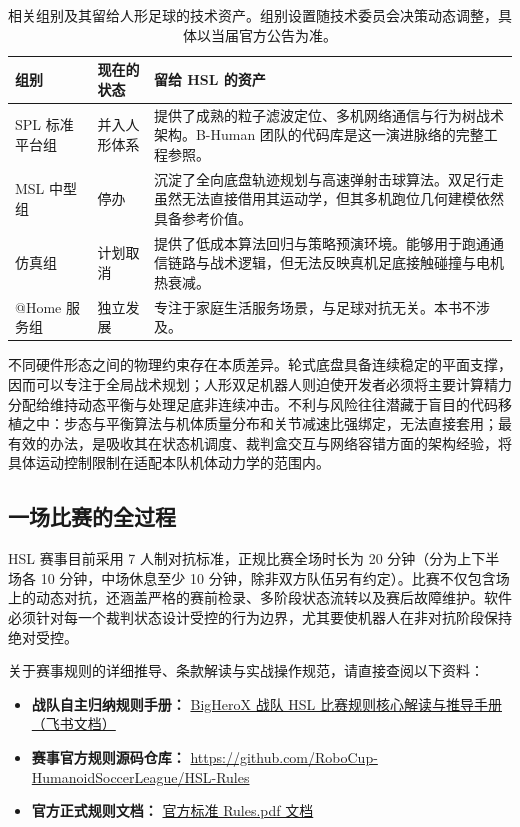 \begin{table}[H]
\centering
\small
\begin{tabularx}{\textwidth}{p{2.6cm} p{3.4cm} X}
\toprule
\textbf{组别} & \textbf{现在的状态} & \textbf{留给 HSL 的资产} \\
\midrule
SPL 标准平台组 & 并入人形体系 & 提供了成熟的粒子滤波定位、多机网络通信与行为树战术架构。B-Human 团队的代码库是这一演进脉络的完整工程参照。 \\
\addlinespace
MSL 中型组 & 停办 & 沉淀了全向底盘轨迹规划与高速弹射击球算法。双足行走虽然无法直接借用其运动学，但其多机跑位几何建模依然具备参考价值。 \\
\addlinespace
仿真组 & 计划取消 & 提供了低成本算法回归与策略预演环境。能够用于跑通通信链路与战术逻辑，但无法反映真机足底接触碰撞与电机热衰减。 \\
\addlinespace
@Home 服务组 & 独立发展 & 专注于家庭生活服务场景，与足球对抗无关。本书不涉及。 \\
\bottomrule
\end{tabularx}
\caption{相关组别及其留给人形足球的技术资产。组别设置随技术委员会决策动态调整，具体以当届官方公告为准。}
\end{table}

不同硬件形态之间的物理约束存在本质差异。轮式底盘具备连续稳定的平面支撑，因而可以专注于全局战术规划；人形双足机器人则迫使开发者必须将主要计算精力分配给维持动态平衡与处理足底非连续冲击。不利与风险往往潜藏于盲目的代码移植之中：步态与平衡算法与机体质量分布和关节减速比强绑定，无法直接套用；最有效的办法，是吸收其在状态机调度、裁判盒交互与网络容错方面的架构经验，将具体运动控制限制在适配本队机体动力学的范围内。\advice

\subsection{一场比赛的全过程}

HSL 赛事目前采用 7 人制对抗标准，正规比赛全场时长为 20 分钟（分为上下半场各 10 分钟，中场休息至少 10 分钟，除非双方队伍另有约定）。比赛不仅包含场上的动态对抗，还涵盖严格的赛前检录、多阶段状态流转以及赛后故障维护。软件必须针对每一个裁判状态设计受控的行为边界，尤其要使机器人在非对抗阶段保持绝对受控。

关于赛事规则的详细推导、条款解读与实战操作规范，请直接查阅以下资料：
\begin{itemize}[leftmargin=*]
    \item \textbf{战队自主归纳规则手册：} \href{https://hcnwvqtaepc6.feishu.cn/wiki/PHPCwZCI8iPhDhksyzNcBFKRnIh?from=from_copylink}{BigHeroX 战队 HSL 比赛规则核心解读与推导手册（飞书文档）}
    \item \textbf{赛事官方规则源码仓库：} \url{https://github.com/RoboCup-HumanoidSoccerLeague/HSL-Rules}
    \item \textbf{官方正式规则文档：} \href{https://github.com/RoboCup-HumanoidSoccerLeague/HSL-Rules/blob/main/Rules.pdf}{官方标准 Rules.pdf 文档}
\end{itemize}

